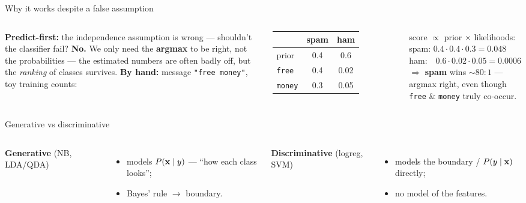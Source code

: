 \documentclass[aspectratio=169]{beamer}
\begin{document}
\begin{frame}{Why it works despite a false assumption}
  \begin{columns}[T]
    \textbf{Predict-first:} the independence assumption is wrong --- shouldn't the classifier fail?
    \pause
    \vskip 4pt
    \textbf{No.} We only need the \textbf{argmax} to be right, not the probabilities --- the
    estimated numbers are often badly off, but the \emph{ranking} of classes survives.
    \vskip 4pt
    \footnotesize \textbf{By hand:} message \texttt{"free money"}, toy training counts:
    \vskip 3pt
    \renewcommand{\arraystretch}{1.15}
    \centering
    \begin{tabular}{l c c}
       & \textbf{spam} & \textbf{ham} \\
      \hline
      prior & 0.4 & 0.6 \\
      \texttt{free} & 0.4 & 0.02 \\
      \texttt{money} & 0.3 & 0.05 \\
      \hline
    \end{tabular}
    \vskip 4pt
    \raggedright score $\propto$ prior $\times$ likelihoods:\\[2pt]
    spam: $0.4\cdot0.4\cdot0.3 = \mathbf{0.048}$\\
    ham:\ \ $0.6\cdot0.02\cdot0.05 = 0.0006$\\[2pt]
    $\Rightarrow$ \textbf{spam} wins $\sim\!80{:}1$ --- argmax right, even though \texttt{free} \&
    \texttt{money} truly co-occur.
  \end{columns}
\end{frame}

\begin{frame}{Generative vs discriminative}
  \begin{columns}[T]
    \textbf{Generative} (NB, LDA/QDA)
    \begin{itemize}\small
      \item models $P(\mathbf{x} \mid y)$ --- ``how each class looks'';
      \item Bayes' rule $\to$ boundary.
    \end{itemize}
    \textbf{Discriminative} (logreg, SVM)
    \begin{itemize}\small
      \item models the boundary / $P(y\mid\mathbf{x})$ directly;
      \item no model of the features.
    \end{itemize}
  \end{columns}
  \vfill
\end{frame}
\end{document}
